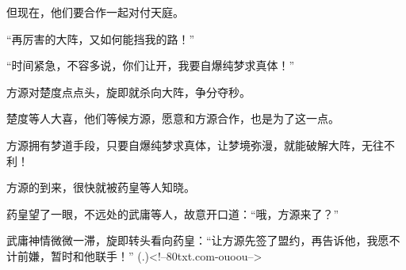 \begin{this_body}
但现在，他们要合作一起对付天庭。

“再厉害的大阵，又如何能挡我的路！”

“时间紧急，不容多说，你们让开，我要自爆纯梦求真体！”

方源对楚度点点头，旋即就杀向大阵，争分夺秒。

楚度等人大喜，他们等候方源，愿意和方源合作，也是为了这一点。

方源拥有梦道手段，只要自爆纯梦求真体，让梦境弥漫，就能破解大阵，无往不利！

方源的到来，很快就被药皇等人知晓。

药皇望了一眼，不远处的武庸等人，故意开口道：“哦，方源来了？”

武庸神情微微一滞，旋即转头看向药皇：“让方源先签了盟约，再告诉他，我愿不计前嫌，暂时和他联手！”	 (.)<!--80txt.com-ouoou-->

\end{this_body}

